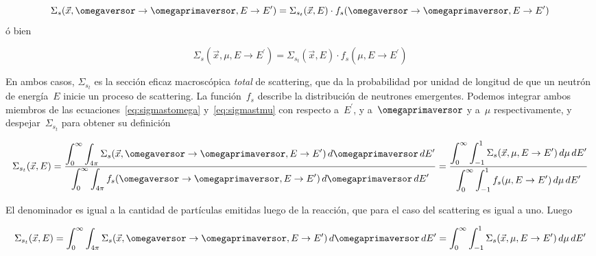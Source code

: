 \begin{equation}
\label{eq:sigmastomega}
 \Sigma_s(\vec{x}, \omegaversor \rightarrow \omegaprimaversor, E \rightarrow E^\prime) = \Sigma_{s_t}(\vec{x}, E) \cdot f_s(\omegaversor \rightarrow \omegaprimaversor, E \rightarrow E^\prime)
\end{equation}
%
ó bien

\begin{equation}
\label{eq:sigmastmu}
 \Sigma_s(\vec{x}, \mu, E \rightarrow E^\prime) = \Sigma_{s_t}(\vec{x}, E) \cdot f_s(\mu, E \rightarrow E^\prime)
\end{equation}

En ambos casos, $\Sigma_{s_t}$ es la sección eficaz macroscópica \emph{total} de scattering, que da la probabilidad por unidad de longitud de que un neutrón de energía~$E$ inicie un proceso de scattering. La función~$f_s$ describe la distribución de neutrones emergentes. Podemos integrar ambos miembros de las ecuaciones~\eqref{eq:sigmastomega} y~\eqref{eq:sigmastmu} con respecto a~$E^\prime$, y a~$\omegaprimaversor$ y a~$\mu$ respectivamente, y despejar~$\Sigma_{s_t}$ para obtener su definición

\begin{equation*}
 \Sigma_{s_t}(\vec{x}, E) =
\frac{\displaystyle \int_{0}^\infty \int_{4\pi} \Sigma_s(\vec{x}, \omegaversor \rightarrow \omegaprimaversor, E \rightarrow E^\prime) \, d\omegaprimaversor \, dE^\prime}
{\displaystyle \int_{0}^\infty \int_{4\pi} f_s(\omegaversor \rightarrow \omegaprimaversor, E \rightarrow E^\prime) \, d\omegaprimaversor \, dE^\prime} 
=
\frac{\displaystyle \int_{0}^\infty \int_{-1}^{1} \Sigma_s(\vec{x}, \mu, E \rightarrow E^\prime) \, d\mu \, dE^\prime}
{\displaystyle \int_{0}^\infty \int_{-1}^{1} f_s(\mu, E \rightarrow E^\prime) \, d\mu \, dE^\prime} 
\end{equation*}

El denominador es igual a la cantidad de partículas emitidas luego de la reacción, que para el caso del scattering es igual a uno. Luego

\begin{equation}\label{eq:sigmast}
 \Sigma_{s_t}(\vec{x}, E) =
 \int_{0}^\infty \int_{4\pi} \Sigma_s(\vec{x}, \omegaversor \rightarrow \omegaprimaversor, E \rightarrow E^\prime) \, d\omegaprimaversor \, dE^\prime
 =
 \int_{0}^\infty \int_{-1}^{1} \Sigma_s(\vec{x}, \mu, E \rightarrow E^\prime) \, d\mu \, dE^\prime 
\end{equation}


